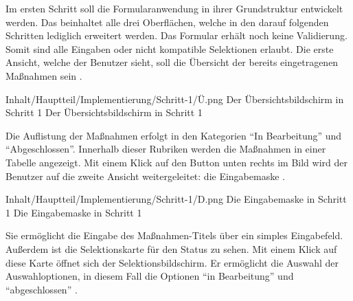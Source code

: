 Im ersten Schritt soll die Formularanwendung in ihrer Grundstruktur entwickelt werden.
 Das beinhaltet alle drei Oberflächen, welche in den darauf folgenden Schritten lediglich erweitert werden.  Das Formular erhält noch keine  Validierung. Somit sind alle Eingaben oder nicht kompatible Selektionen erlaubt. Die erste Ansicht, welche der Benutzer sieht, soll die Übersicht der bereits eingetragenen Maßnahmen sein \Abb{\ref{fig:Schritt1Uebersicht}}.
 
\begin{alexfigure}{Inhalt/Hauptteil/Implementierung/Schritt-1/Ü.png}
  {Der Übersichtsbildschirm in Schritt 1}
  {Der Übersichtsbildschirm in Schritt 1}

  \label{fig:Schritt1Uebersicht}

\end{alexfigure}

Die Auflistung der Maßnahmen erfolgt in den Kategorien \enquote{In Bearbeitung} und \enquote{Abgeschlossen}.
Innerhalb dieser Rubriken werden die Maßnahmen in einer Tabelle angezeigt.
Mit einem Klick auf den Button unten rechts im Bild wird der Benutzer auf die zweite Ansicht weitergeleitet: die Eingabemaske \Abb{\ref{fig:Schritt1Eingabemaske}}.

\begin{alexfigure}{Inhalt/Hauptteil/Implementierung/Schritt-1/D.png}
  {Die Eingabemaske in Schritt 1}
  {Die Eingabemaske in Schritt 1}

  \label{fig:Schritt1Eingabemaske}

\end{alexfigure}

Sie ermöglicht die Eingabe des Maßnahmen-Titels über ein simples Eingabefeld.
Außerdem ist die Selektionskarte für den Status zu sehen.
Mit einem Klick auf diese Karte öffnet sich der Selektionsbildschirm.
Er ermöglicht die Auswahl der Auswahloptionen, in diesem Fall die Optionen \enquote{in Bearbeitung} und \enquote{abgeschlossen}
\Abb{\ref{fig:Schritt1SelektionsBildschirmStatus}}.

